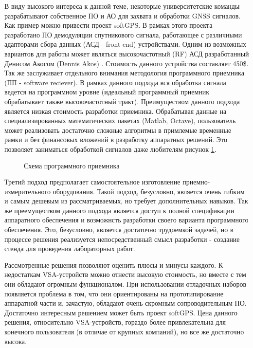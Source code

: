 \documentclass[a4paper,12pt]{article}
\numberwithin{table}{section}
\begin{document}
В виду высокого интереса к данной теме, некоторые университетские команды разрабатывают собственное ПО и АО 
для захвата и обработки GNSS сигналов.
Как пример можно привести проект softGPS.
В рамках этого проекта разработано ПО демодуляции спутникового сигнала, работающее с различными адапторами сбора данных
(АСД - front-end) устройствами.
Одним из возможных вариантов для работы может являться высокочастотный (RF) АСД разработанный Денисом Акосом (Dennis Akos) \cite{akos-frontend}.
Стоимость данного устройства составляет 450\$.
Так же заслуживает отдельного внимания методология программного приемника (ПП - software reciever).
В рамках данного подхода вся обработка сигнала ведется на программном уровне (идеальный программный приемник обрабатывает также 
высокочастотный тракт).
Преимуществом данного подхода является низкая стоимость разработки приемника.
Обрабатывая данные на специализированных математических пакетах (Matlab, Octave), пользователь может реализовать достаточно сложные алгоритмы в примлемые
временные рамки и без финансовых вложений в разработку аппаратных решений. Это позволяет заниматься обработкой сигналов даже любителям
рисунок \ref{pic:sdr}.

\begin{figure}[h]
\begin{center}
\end{center}
\caption{Схема программного приемника}
\label{pic:sdr}
\end{figure}

Третий подход предполагает самостоятельное изготовление приемно-измерительного оборудования.
Такой подход, безусловно, является очень гибким и самым дешевым из рассматриваемых, но требует дополнительных навыков.
Так же преемуществом данного подхода является доступ к полной спецификации аппаратного обеспечения и возможнсть
разработки своего варианта программного обеспечения.
Это, безусловно, является достаточно трудоемкой задачей, но в процессе решения реализуется непосредственный
смысл разработки - создание стенда для проведения лабораторных работ.

Рассмотренные решения позволяют оценить плюсы и минусы каждого.
К недостаткам VSA-устройств можно отнести высокую стоимость, но вместе с тем они обладают огромным функционалом.
При использовании отладочных наборов появляется проблема в том, что они ориентированы на прототипирование аппаратной
части и, зачастую, обладают очень скромным сопроводительным ПО.
Достаточно интересным решением может быть проект softGPS.
Цена данного решения, относительно VSA-устройств, гораздо более привлекательна для конечного пользователя
(в отличае от крупных компаний), но все же достаточно высока.
\end{document}
